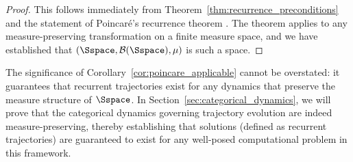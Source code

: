 \begin{proof}
This follows immediately from Theorem~\ref{thm:recurrence_preconditions} and the statement of Poincaré's recurrence theorem \citep{poincare1890probleme}. The theorem applies to any measure-preserving transformation on a finite measure space, and we have established that $(\Sspace, \mathcal{B}(\Sspace), \mu)$ is such a space.
\end{proof}

The significance of Corollary~\ref{cor:poincare_applicable} cannot be overstated: it guarantees that recurrent trajectories exist for any dynamics that preserve the measure structure of $\Sspace$. In Section~\ref{sec:categorical_dynamics}, we will prove that the categorical dynamics governing trajectory evolution are indeed measure-preserving, thereby establishing that solutions (defined as recurrent trajectories) are guaranteed to exist for any well-posed computational problem in this framework.
